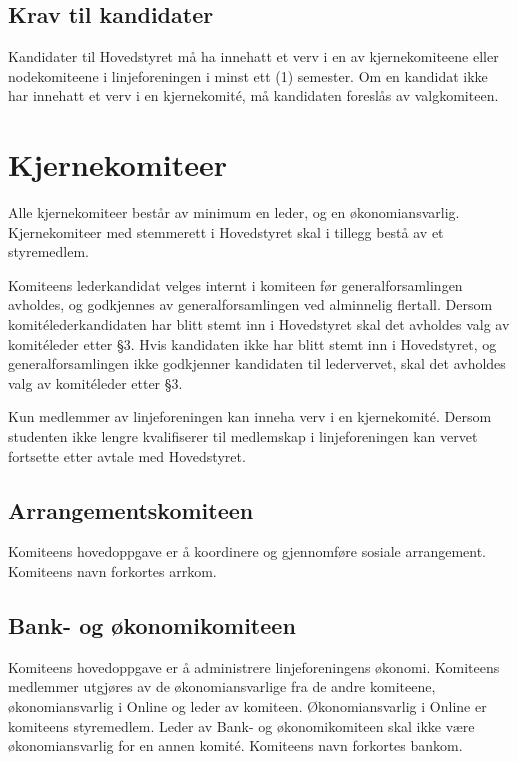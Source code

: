 \subsection{Krav til kandidater}{
Kandidater til Hovedstyret må ha innehatt et verv i en av kjernekomiteene eller nodekomiteene i linjeforeningen i minst ett (1) semester. Om en kandidat ikke har innehatt et verv i en kjernekomité, må kandidaten foreslås av valgkomiteen.
}



\section{Kjernekomiteer}
\label{sec:komiteer}
\vspace{23pt}

Alle kjernekomiteer består av minimum en leder, og en økonomiansvarlig. Kjernekomiteer med stemmerett i Hovedstyret skal i tillegg bestå av et styremedlem.\newline

Komiteens lederkandidat velges internt i komiteen før generalforsamlingen avholdes, og godkjennes av generalforsamlingen ved alminnelig flertall. Dersom komitélederkandidaten har blitt stemt inn i Hovedstyret skal det avholdes valg av komitéleder etter §3. Hvis kandidaten ikke har blitt stemt inn i Hovedstyret, og generalforsamlingen ikke godkjenner kandidaten til ledervervet, skal det avholdes valg av komitéleder etter §3.\newline

Kun medlemmer av linjeforeningen kan inneha verv i en kjernekomité. Dersom studenten ikke lengre kvalifiserer til medlemskap i linjeforeningen kan vervet fortsette etter avtale med Hovedstyret.

\vspace{-10pt}
\subsection{Arrangementskomiteen}{
Komiteens hovedoppgave er å koordinere og gjennomføre sosiale arrangement. Komiteens navn forkortes arrkom.

}

\vspace{-10pt}
\subsection{Bank- og økonomikomiteen}{
Komiteens hovedoppgave er å administrere linjeforeningens økonomi. Komiteens medlemmer utgjøres av de økonomiansvarlige fra de andre komiteene, økonomiansvarlig i Online og leder av komiteen. Økonomiansvarlig i Online er komiteens styremedlem. Leder av Bank- og økonomikomiteen skal ikke være økonomiansvarlig for en annen komité. Komiteens navn forkortes bankom.
}


